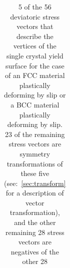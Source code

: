 \documentclass[preprint,3p,times,sort&compress,letterpaper,12pt]{elsarticle} %
\begin{document}
\begin{table}[H]
\begin{tabular}{c c c c c | c}
    \end{tabular}
    \caption{5 of the 56 deviatoric stress vectors that describe the vertices of the single crystal yield surface for the case of an FCC material plastically deforming by  slip or a BCC material plastically deforming by  slip. 23 of the remaining stress vectors are symmetry transformations of these five (see:~\ref{sec:transform} for a description of vector transformation), and the other remaining 28 stress vectors are negatives of the other 28}
    \label{tab:fcc_verts}
\end{table}
\end{document}
